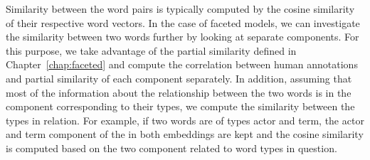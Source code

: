 Similarity between the word pairs is typically computed by the cosine similarity of their respective word vectors. In the case of faceted models, we can investigate the similarity between two words further by looking at separate components. For this purpose, we take advantage of the partial similarity defined in Chapter~\ref{chap:faceted} and compute the correlation between human annotations and partial similarity of each component separately. In addition, assuming that most of the information about the relationship between the two words is in the component corresponding to their types, we compute the similarity between the types in relation. For example, if two words are of types actor and term, the actor and term component of the in both embeddings are kept and the cosine similarity is computed based on the two component related to word types in question. 
